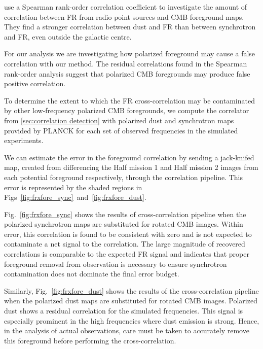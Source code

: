 \documentclass[usenatbib,hidelinks]{mnras}
\begin{document}
{\citet{dineen:2004} use a Spearman rank-order correlation coefficient to investigate the amount of correlation between FR from radio point sources and CMB foreground maps. 
They find a stronger correlation between dust and FR than between synchrotron and FR, even outside the galactic centre.

For our analysis we are investigating how polarized 
foreground may cause a false correlation with our method. The residual 
correlations found in the Spearman rank-order analysis suggest that 
polarized CMB foregrounds may produce false positive correlation. 



To determine the extent to which the FR cross-correlation may be contaminated by other low-frequency polarized CMB foregrounds, we compute the correlator from \autoref{sec:correlation detection}  with polarized dust and synchrotron maps provided by PLANCK \citep{planck:2015fore} for each set of observed frequencies in the simulated experiments.

We can estimate the error in the foreground correlation by sending a jack-knifed map, created from differencing the Half mission 1 and Half mission 2 images from each potential foreground respectively, through the correlation pipeline. This error is represented by the shaded regions in Figs~\ref{fig:frxfore_sync}~and~\ref{fig:frxfore_dust}.

 Fig.~\ref{fig:frxfore_sync} shows the results of cross-correlation pipeline when the polarized synchrotron maps are substituted for rotated CMB images. Within error, this correlation is found to be consistent with zero and is not expected to contaminate a net signal to the correlation. The large magnitude of recovered correlations is comparable to the expected FR signal and indicates
that proper foreground removal from observation is necessary to ensure synchrotron contamination does not dominate the final error budget.


Similarly, Fig.~\ref{fig:frxfore_dust}  shows the results of the cross-correlation pipeline when the polarized dust maps are substituted for rotated CMB images. Polarized dust shows a residual correlation for the simulated frequencies. This signal is especially prominent in the high frequencies where dust emission is strong.
Hence, in the analysis of actual observations, care must be taken to accurately remove this foreground before performing the cross-correlation.

}
\end{document}
